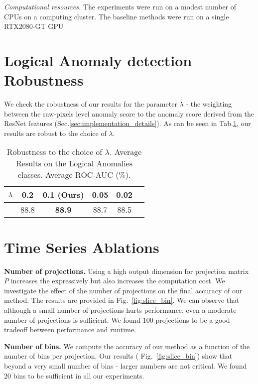 \documentclass{article}
\begin{document}
\textit{Computational resources.} The experiments were run on a modest number of CPUs on a computing cluster. The baseline methods were run on a single RTX2080-GT GPU

\section{Logical Anomaly detection Robustness }
\label{app:loco_robust}
We check the robustness of our results for the parameter $\lambda$ - the weighting between the raw-pixels level anomaly score to the anomaly score derived from the ResNet features (Sec.\ref{sec:implementation_details}). As can be seen in Tab.\ref{tab:lambda_robust}, our results are robust to the choice of $\lambda$.


\begin{table}
\caption{Robustness to the choice of $\lambda$. Average Results on the Logical Anomalies classes. Average ROC-AUC  ($\%$).}
\centering
\begin{tabular}{lccccc}
\toprule

	$\lambda$ &	0.2	&	0.1 (Ours)		&	0.05	&	0.02	\\ \midrule

	&	88.8	&	\textbf{88.9}	&	88.7			&	88.5 \\


\bottomrule
\end{tabular}
\label{tab:lambda_robust}
\end{table}


\section{Time Series Ablations}
\label{app:ablations}

\textbf{Number of projections.} Using a high output dimension for projection matrix $P$ increases the expressively but also increases the computation cost. We investigate the effect of the number of projections on the final accuracy of our method. The results are provided in Fig.~\ref{fig:slice_bin}. We can observe that although a small number of projections hurts performance, even a moderate number of projections is sufficient. We found $100$ projections to be a good tradeoff between performance and runtime.

\textbf{Number of bins.} We compute the accuracy of our method as a function of the number of bins per projection. Our results ( Fig.~\ref{fig:slice_bin}) show that beyond a very small number of bins - larger numbers are not critical. We found $20$ bins to be sufficient in all our experiments.
\end{document}
